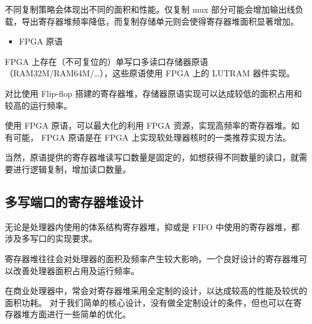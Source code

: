 不同复制策略会体现出不同的面积和性能。仅复制 mux 部分可能会增加输出线负载，导出寄存器堆频率降低，而复制存储单元则会使得寄存器堆面积显著增加。

\begin{itemize}
\tightlist
\item
  FPGA 原语
\end{itemize}

FPGA 上存在（不可复位的）单写口多读口存储器原语（RAM32M/RAM64M/\ldots），这些原语使用 FPGA 上的 LUTRAM 器件实现。

对比使用 Flip-flop 搭建的寄存器堆，存储器原语实现可以达成较低的面积占用和较高的运行频率。

使用 FPGA 原语，可以最大化的利用 FPGA 资源，实现高频率的寄存器堆。如有可能， FPGA 原语是在 FPGA 上实现软处理器核时的一类推荐实现方法。

当然，原语提供的寄存器堆读写口数量是固定的，如想获得不同数量的读口，就需要进行逻辑复制，增加读口数量。

\subsection{多写端口的寄存器堆设计}\label{sec:11-advanced-cpu-014}

无论是处理器内使用的体系结构寄存器堆，抑或是 FIFO 中使用的寄存器堆，都涉及多写口的实现要求。

寄存器堆往往会对处理器的面积及频率产生较大影响，一个良好设计的寄存器堆可以改善处理器面积占用及运行频率。

在商业处理器中，常会对寄存器堆采用全定制的设计，以达成较高的性能及较优的面积功耗。
对于我们简单的核心设计，没有做全定制设计的条件，但也可以在寄存器堆方面进行一些简单的优化。

